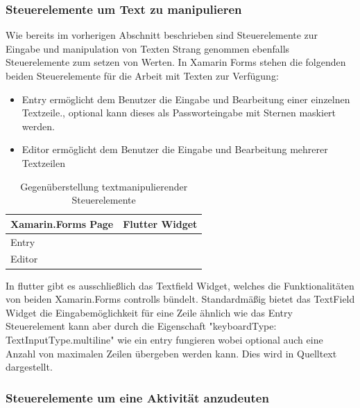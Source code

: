 \subsubsection{Steuerelemente um Text zu manipulieren}
Wie bereits im vorherigen Abschnitt beschrieben sind Steuerelemente zur Eingabe und manipulation von Texten Strang genommen ebenfalls Steuerelemente zum setzen von Werten.  In Xamarin Forms stehen die folgenden beiden Steuerelemente für die Arbeit mit Texten zur Verfügung:
\begin{itemize}
\setlength\itemsep{-0.6em}
 \item Entry ermöglicht dem Benutzer die Eingabe und Bearbeitung einer einzelnen Textzeile., optional kann dieses als Passworteingabe mit Sternen maskiert werden.
 \item Editor ermöglicht dem Benutzer die Eingabe und Bearbeitung mehrerer Textzeilen
\end{itemize}

\begin{table}[!ht]
\begin{tabularx}{\textwidth}{X|X}
   \textbf{Xamarin.Forms Page} & \textbf{Flutter Widget}  \\
\hline
	Entry		       		&  	 		\\ 
	Editor		       	&  	 		\\ 
\end{tabularx}
\caption{Gegenüberstellung textmanipulierender Steuerelemente}
 \label{tab:eventcommands}
\end{table}


In flutter gibt es ausschließlich das Textfield Widget, welches die Funktionalitäten von beiden Xamarin.Forms controlls bündelt.  Standardmäßig bietet das TextField Widget die Eingabemöglichkeit für eine Zeile ähnlich wie das Entry Steuerelement kann aber durch die Eigenschaft "keyboardType: TextInputType.multiline" wie ein entry fungieren wobei optional auch eine Anzahl von maximalen Zeilen übergeben werden kann.  Dies wird in Quelltext dargestellt.

 \begin{minipage}{\linewidth}

\end{minipage}


\subsubsection{Steuerelemente um eine Aktivität anzudeuten}

